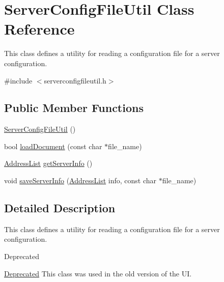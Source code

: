 \hypertarget{classServerConfigFileUtil}{\section{Server\-Config\-File\-Util Class Reference}
\label{classServerConfigFileUtil}
}


This class defines a utility for reading a configuration file for a server configuration.  




{\ttfamily \#include $<$serverconfigfileutil.\-h$>$}

\subsection*{Public Member Functions}
\begin{DoxyCompactItemize}
\item 
\hyperlink{classServerConfigFileUtil_a49ddf234cbc1b215d7a65ee6dd710bb3}{Server\-Config\-File\-Util} ()
\item 
bool \hyperlink{classServerConfigFileUtil_a9b089be8defbadfd37fcdefee8b22ade}{load\-Document} (const char $\ast$file\-\_\-name)
\item 
\hyperlink{serverconfigfileutil_8h_a90d1af3762c28656b0507bb3a650f96e}{Address\-List} \hyperlink{classServerConfigFileUtil_a1eaba4990950df8f21ee8ae99b638a9d}{get\-Server\-Info} ()
\item 
void \hyperlink{classServerConfigFileUtil_a15d3e0e7fed7ef522b587878221dd13c}{save\-Server\-Info} (\hyperlink{serverconfigfileutil_8h_a90d1af3762c28656b0507bb3a650f96e}{Address\-List} info, const char $\ast$file\-\_\-name)
\end{DoxyCompactItemize}


\subsection{Detailed Description}
This class defines a utility for reading a configuration file for a server configuration. 

\begin{DoxyRefDesc}{Deprecated}
\item[\hyperlink{deprecated__deprecated000005}{Deprecated}]This class was used in the old version of the U\-I. \end{DoxyRefDesc}


